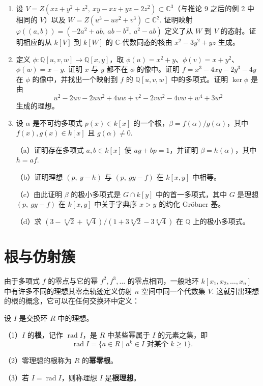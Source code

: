 \begin{enumerate}
（b）设 \(\varphi : V \to V\) 是对应于 \(\varphi\) 的态射。注意 \((-2,1,1) \in V\)，计算 \(\varphi((-2,1,1)) \in V\).

（c）证明 \(V\) 上有无限多个点 \((a,b,c)\) 满足 \(a, b, c \in \mathbb{Z}\) 且 \(a, b, c\) 的最大公因数为 1.

\item 设 \(V = Z(xz+y^2+z^2,\ xy-xz+yz-2z^2) \subset \mathbb{C}^3\)（与推论 9 之后的例 2 中相同的 \(V\)）以及 \(W = Z(u^3-uv^2+v^3) \subset \mathbb{C}^2\). 证明映射 \(\varphi((a,b)) = (-2a^2+ab,\ ab-b^2,\ a^2-ab)\) 定义了从 \(W\) 到 \(V\) 的态射。证明相应的从 \(k[V]\) 到 \(k[W]\) 的 \(\mathbb{C}\)-代数同态的核由 \(x^2-3y^2+yz\) 生成。

\item 定义 \(\phi : \mathbb{Q}[u,v,w] \to \mathbb{Q}[x,y]\)，取 \(\phi(u) = x^2+y\)、\(\phi(v) = x+y^2\)、\(\phi(w) = x-y\). 证明 \(x\) 与 \(y\) 都不在 \(\phi\) 的像中。证明 \(f = x^3-4xy-2y^3-4y\) 在 \(\phi\) 的像中，并找出一个映射到 \(f\) 的 \(\mathbb{Q}[u,v,w]\) 中的多项式。证明 \(\ker\phi\) 是由
\[
u^2-2uv-2uw^2+4uw+v^2-2vw^2-4vw+w^4+3w^2
\]
生成的理想。

\item 设 \(\alpha\) 是不可约多项式 \(p(x) \in k[x]\) 的一个根，\(\beta = f(\alpha)/g(\alpha)\)，其中 \(f(x), g(x) \in k[x]\) 且 \(g(\alpha) \neq 0\).

（a）证明存在多项式 \(a, b \in k[x]\) 使 \(ag+bp = 1\)，并证明 \(\beta = h(\alpha)\)，其中 \(h = af\).

（b）证明理想 \((p,\ y-h)\) 与 \((p,\ gy-f)\) 在 \(k[x,y]\) 中相等。

（c）由此证明 \(\beta\) 的极小多项式是 \(G \cap k[y]\) 中的首一多项式，其中 \(G\) 是理想 \((p,\ gy-f)\) 在 \(k[x,y]\) 中关于字典序 \(x > y\) 的约化 Gröbner 基。

（d）求 \((3-\sqrt[3]{2}+\sqrt[3]{4})/(1+3\sqrt[3]{2}-3\sqrt[3]{4})\) 在 \(\mathbb{Q}\) 上的极小多项式。
\end{enumerate}

\section{根与仿射簇}

由于多项式 \(f\) 的零点与它的幂 \(f^2, f^3, \ldots\) 的零点相同，一般地环 \(k[x_1, x_2, \ldots, x_n]\) 中有许多不同的理想其零点轨迹定义仿射 \(n\) 空间中同一个代数集 \(V\). 这就引出理想的根的概念，它可以在任何交换环中定义：

\begin{definition}
设 \(I\) 是交换环 \(R\) 中的理想。

（1）\(I\) 的\textbf{根}，记作 \(\operatorname{rad}I\)，是 \(R\) 中某些幂属于 \(I\) 的元素之集，即
\[
\operatorname{rad}I = \{a \in R \mid a^k \in I \text{ 对某个 } k \geq 1\}.
\]

（2）零理想的根称为 \(R\) 的\textbf{幂零根}。

（3）若 \(I = \operatorname{rad}I\)，则称理想 \(I\) 是\textbf{根理想}。
\end{definition}


